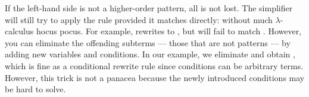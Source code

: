 \begin{isabellebody}
\begin{isamarkuptext}
If the left-hand side is not a higher-order pattern, all is not lost.
The simplifier will still try to apply the rule provided it
matches directly: without much $\lambda$-calculus hocus
pocus.  For example,  rewrites
 to , but will fail to match
.  However, you can
eliminate the offending subterms --- those that are not patterns ---
by adding new variables and conditions.
In our example, we eliminate  and obtain
 , which is fine
as a conditional rewrite rule since conditions can be arbitrary
terms.  However, this trick is not a panacea because the newly
introduced conditions may be hard to solve.
  

\end{isamarkuptext}
\end{isabellebody}
